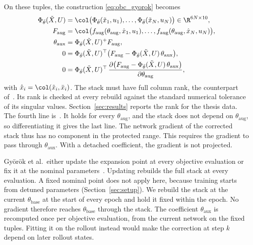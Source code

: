 On these tuples, the construction \eqref{eq:obc_gyorok} becomes
\begin{equation}
\begin{aligned}
 \Phi_{\bar\theta}(\tilde X,U)
 &=\col\bigl(\Phi_{\bar\theta}(\tilde x_1,u_1),\dots,
   \Phi_{\bar\theta}(\tilde x_N,u_N)\bigr)\in\R^{6N\times10},\\
 F_{\mathrm{aug}}
 &=\col\bigl(f_{\mathrm{aug}}(\theta_{\mathrm{aug}},\hat x_1,u_1),\dots,
   f_{\mathrm{aug}}(\theta_{\mathrm{aug}},\hat x_N,u_N)\bigr),\\
 \theta_{\mathrm{aux}}&=\Phi_{\bar\theta}(\tilde X,U)^{+}F_{\mathrm{aug}},\\
 0&=\Phi_{\bar\theta}(\tilde X,U)^\top
   \bigl(F_{\mathrm{aug}}-\Phi_{\bar\theta}(\tilde X,U)\,\theta_{\mathrm{aux}}\bigr),\\
 0&=\Phi_{\bar\theta}(\tilde X,U)^\top\,
   \frac{\partial\bigl(F_{\mathrm{aug}}-\Phi_{\bar\theta}(\tilde X,U)\,
   \theta_{\mathrm{aux}}\bigr)}{\partial\theta_{\mathrm{aug}}},
\end{aligned}
\label{eq:obc_ours}
\end{equation}
with $\hat x_i=\col(\tilde x_i,\bar x_i)$.
The stack must have full column rank, the counterpart
of~\cite[Assumption~1]{gyorok2026obc}.
Its rank is checked at every rebuild against the standard numerical tolerance
of its singular values.
Section~\ref{sec:results} reports the rank for the thesis data.
The fourth line is~\cite[Lemma~3]{gyorok2026obc}.
It holds for every $\theta_{\mathrm{aug}}$, and the stack does not depend on
$\theta_{\mathrm{aug}}$, so differentiating it gives the last line.
The network gradient of the corrected stack thus has no component in the
protected range.
This requires the gradient to pass through $\theta_{\mathrm{aux}}$.
With a detached coefficient, the gradient is not projected.

Gy\"or\"ok et al.\ either update the expansion point at every objective
evaluation or fix it at the nominal
parameters~\cite[Sec.~4]{gyorok2025l4dc}.
Updating rebuilds the full stack at every evaluation.
A fixed nominal point does not apply here, because training starts from
detuned parameters (Section~\ref{sec:setup}).
We rebuild the stack at the current $\theta_{\mathrm{base}}$ at the start of
every epoch and hold it fixed within the epoch.
No gradient therefore reaches $\theta_{\mathrm{base}}$ through the stack.
The coefficient $\theta_{\mathrm{aux}}$ is recomputed once per objective
evaluation, from the current network on the fixed tuples.
Fitting it on the rollout instead would make the correction at step $k$ depend
on later rollout states.

